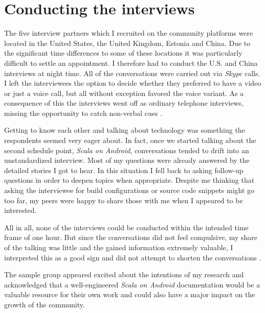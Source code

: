 \section{Conducting the interviews}

The five interview partners which I recruited on the community platforms were located in the United States, the United Kingdom, Estonia and China. Due to the significant time differences to some of these locations it was particularly difficult to settle an appointment. I therefore had to conduct the U.S. and China interviews at night time. All of the conversations were carried out via \textit{Skype} calls. I left the interviewees the option to decide whether they preferred to have a video or just a voice call, but all without exception favored the voice variant. As a consequence of this the interviews went off as ordinary telephone interviews, missing the opportunity to catch non-verbal cues \cite[p. 82]{berg01}.

Getting to know each other and talking about technology was something the respondents seemed very eager about. In fact, once we started talking about the second schedule point, \textit{Scala on Android}, conversations tended to drift into an unstandardized interview. Most of my questions were already answered by the detailed stories I got to hear. In this situation I fell back to asking follow-up questions in order to deepen topics when appropriate. Despite me thinking that asking the interviewee for build configurations or source code snippets might go too far, my peers were happy to share those with me when I appeared to be interested.

All in all, none of the interviews could be conducted within the intended time frame of one hour. But since the conversations did not feel compulsive, my share of the talking was little and the gained information extremely valuable, I interpreted this as a good sign and did not attempt to shorten the conversations \cite[p. 81]{berg01}.

The sample group appeared excited about the intentions of my research and acknowledged that a well-engineered \textit{Scala on Android} documentation would be a valuable resource for their own work and could also have a major impact on the growth of the community.